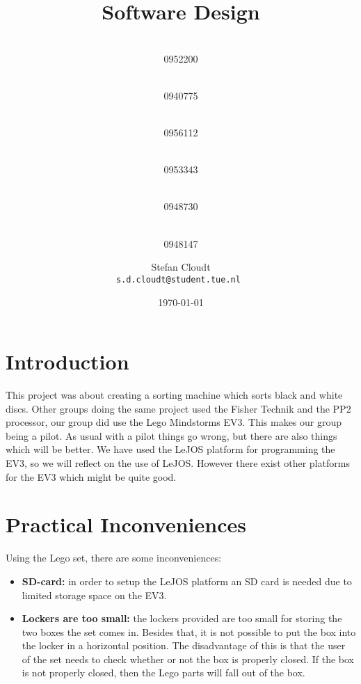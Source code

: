 \documentclass[a4paper,oneside,11pt]{article}
\title{\vspace{-\baselineskip}\sffamily\bfseries Software Design}
\author{
	\makebox[.25\linewidth]{Sergio van Amerongen}\\0952200 \and
	\makebox[.25\linewidth]{Stefan Cloudt}\\0940775 \and
	\makebox[.25\linewidth]{Daan de Graaf}\\0956112 \and
	\makebox[.25\linewidth]{Robert van Lente}\\0953343 \and
	\makebox[.25\linewidth]{Tom Peters}\\0948730 \and
	\makebox[.25\linewidth]{Berrie Trippe}\\0948147 
	\and \makebox[.75\linewidth]{\textbf{Responsible:}} \and
	Stefan Cloudt\\ \tt{s.d.cloudt@student.tue.nl}
}
\date{\today}
\begin{document}
\maketitle
\section{Introduction}
This project was about creating a sorting machine which sorts black and white discs. Other groups doing the same project used the Fisher Technik and the PP2 processor, our group did use the Lego Mindstorms EV3. This makes our group being a pilot. As usual with a pilot things go wrong, but there are also things which will be better. We have used the LeJOS platform for programming the EV3, so we will reflect on the use of LeJOS. However there exist other platforms for the EV3 which might be quite good.

\section{Practical Inconveniences}
Using the Lego set, there are some inconveniences:

\begin{itemize}
    \item \textbf{SD-card:} in order to setup the LeJOS platform an SD card is needed due to limited storage space on the EV3.
    \item \textbf{Lockers are too small:} the lockers provided are too small for storing the two boxes the set comes in. Besides that, it is not possible to put the box into the locker in a horizontal position. The disadvantage of this is that the user of the set needs to check whether or not the box is properly closed. If the box is not properly closed, then the Lego parts will fall out of the box.
\end{itemize}
\end{document}
